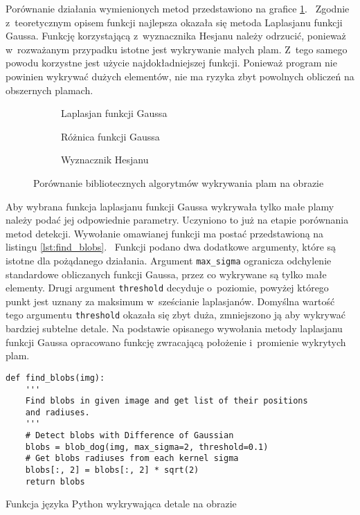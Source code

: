 Porównanie działania wymienionych metod przedstawiono na grafice
\ref{fig:blob_compare}.~%
Zgodnie z~teoretycznym opisem funkcji najlepsza okazała się metoda Laplasjanu
funkcji Gaussa.
Funkcję korzystającą z~wyznacznika Hesjanu należy odrzucić, ponieważ
w~rozważanym przypadku istotne jest wykrywanie małych plam.
Z~tego samego powodu korzystne jest użycie najdokładniejszej funkcji.
Ponieważ program nie powinien wykrywać dużych elementów, nie ma ryzyka zbyt
powolnych obliczeń na obszernych plamach.
\begin{figure}[htb]
    \hspace*{\fill}
    \begin{subfigure}[t]{0.3\textwidth}
        \centering
        
        \caption{Laplasjan funkcji Gaussa}
    \end{subfigure}
    \hfill
    \begin{subfigure}[t]{0.3\textwidth}
        \centering
        
        \caption{Różnica funkcji Gaussa}
    \end{subfigure}
    \hfill
    \begin{subfigure}[t]{0.3\textwidth}
        \centering
        
        \caption{Wyznacznik Hesjanu}
    \end{subfigure}
    \hspace*{\fill}
    \caption{Porównanie bibliotecznych algorytmów wykrywania plam na obrazie}
    \label{fig:blob_compare}
\end{figure}

Aby wybrana funkcja laplasjanu funkcji Gaussa wykrywała tylko małe plamy należy
podać jej odpowiednie parametry.
Uczyniono to już na etapie porównania metod detekcji.
Wywołanie omawianej funkcji ma postać przedstawioną na listingu
\ref{lst:find_blobs}.~%
Funkcji podano dwa dodatkowe argumenty, które są istotne dla pożądanego
działania.
Argument \texttt{max_sigma} ogranicza odchylenie standardowe
obliczanych funkcji Gaussa, przez co wykrywane są tylko małe elementy.
Drugi argument \texttt{threshold} decyduje o~poziomie, powyżej
którego punkt jest uznany za maksimum w~sześcianie laplasjanów.
Domyślna wartość tego argumentu \texttt{threshold} okazała się zbyt
duża, zmniejszono ją aby wykrywać bardziej subtelne detale.
Na podstawie opisanego wywołania metody laplasjanu funkcji Gaussa opracowano
funkcję zwracającą położenie i~promienie wykrytych plam.
\begin{listing}[htb]
\begin{verbatim}
def find_blobs(img):
    '''
    Find blobs in given image and get list of their positions
    and radiuses.
    '''
    # Detect blobs with Difference of Gaussian
    blobs = blob_dog(img, max_sigma=2, threshold=0.1)
    # Get blobs radiuses from each kernel sigma
    blobs[:, 2] = blobs[:, 2] * sqrt(2)
    return blobs
\end{verbatim}
\caption{Funkcja języka Python wykrywająca detale na obrazie}
\label{lst:find_blobs}
\end{listing}


